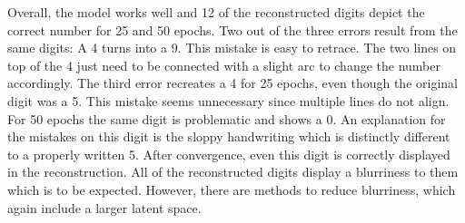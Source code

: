 Overall, the model works well and 12 of the reconstructed digits depict the correct number for 25 and 50 epochs. Two out of the three errors result from the same digits: A 4 turns into a 9. This mistake is easy to retrace. The two lines on top of the 4 just need to be connected with a slight arc to change the number accordingly. The third error recreates a 4 for 25 epochs, even though the original digit was a 5. This mistake seems unnecessary since multiple lines do not align. For 50 epochs the same digit is problematic and shows a 0. An explanation for the mistakes on this digit is the sloppy handwriting which is distinctly different to a properly written 5. After convergence, even this digit is correctly displayed in the reconstruction. All of the reconstructed digits display a blurriness to them which is to be expected. However, there are methods to reduce blurriness, which again include a larger latent space. \\ 

